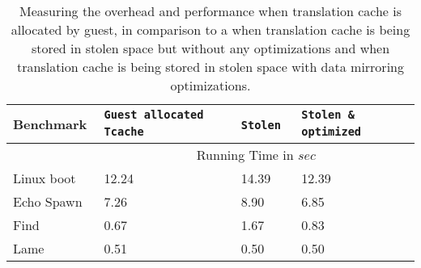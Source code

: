 \begin{table*}
\centering
      \begin{tabular}{|l| p{3.1cm} |p{3.1cm}|p{3.1cm}|} \hline
        Benchmark\verb, ,& {\tt Guest allocated Tcache} \verb, ,& {\tt Stolen} \verb, ,& {\tt Stolen \& optimized} \verb, , \\ \hline

     & \multicolumn{3}{c|}{Running Time in $sec$}\\ \cline {2-4}
Linux boot	&	12.24	&	14.39	&	12.39	\\
Echo Spawn	&	7.26	&	8.90	&	6.85	\\
Find	&	0.67	&	1.67	&	0.83	\\
Lame	&	0.51	&	0.50	&	0.50	\\
\hline
      \end{tabular}
\caption{\label{tab:tcache}Measuring the overhead and performance when translation cache is allocated by guest, in comparison to a when translation cache is being stored in stolen space but without any optimizations and when translation cache is being stored in stolen space with data mirroring optimizations.}
\end{table*}







